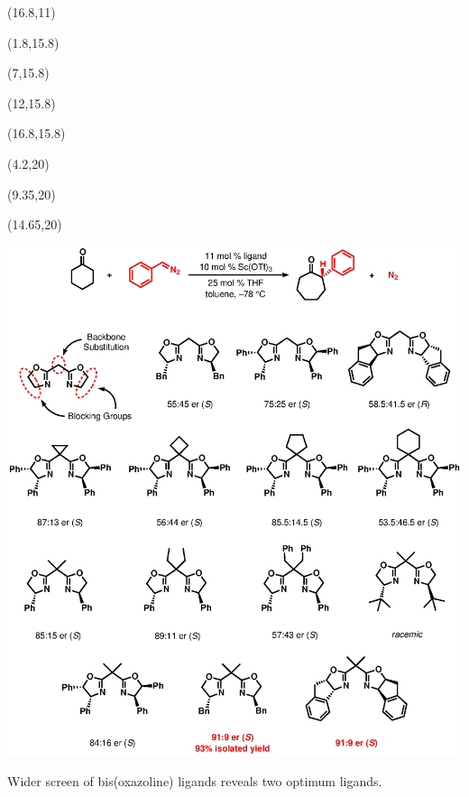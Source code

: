 \begin{Scheme}[p]
     \begin{textblock}{1}(16.8,11)  \end{textblock}
    \begin{textblock}{1}(1.8,15.8)  \end{textblock}
    \begin{textblock}{1}(7,15.8)  \end{textblock}
     \begin{textblock}{1}(12,15.8)  \end{textblock}
     \begin{textblock}{1}(16.8,15.8)  \end{textblock}
    \begin{textblock}{1}(4.2,20)  \end{textblock}
    \begin{textblock}{1}(9.35,20)  \end{textblock} %
     \begin{textblock}{1}(14.65,20)  \end{textblock} %
  \includegraphics[scale=0.8]{chp_asymmetric/images/bigboxscreen}
  \vspace{10pt}
  \caption{Wider screen of bis(oxazoline) ligands reveals two optimum ligands.}
  \label{sch:asbigboxscreen}
\end{Scheme}
